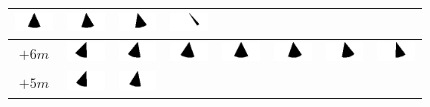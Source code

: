 \begin{tabular}{|c|c|c|c|c|c|c|c|}
	\includegraphics[width=1cm]{img_Bereich/V1_img_res_Winkel_X_0_7000.png}&
	\includegraphics[width=1cm]{img_Bereich/V1_img_res_Winkel_X_1000_7000.png}&
	\includegraphics[width=1cm]{img_Bereich/V1_img_res_Winkel_X_2000_7000.png}&
	\includegraphics[width=1cm]{img_Bereich/V1_img_res_Winkel_X_3000_7000.png}\\ 
	\hline 
	$+6m$ &
	\includegraphics[width=1cm]{img_Bereich/V1_img_res_Winkel_X_-3000_6000.png} &
	\includegraphics[width=1cm]{img_Bereich/V1_img_res_Winkel_X_-2000_6000.png}&
	\includegraphics[width=1cm]{img_Bereich/V1_img_res_Winkel_X_-1000_6000.png}&
	\includegraphics[width=1cm]{img_Bereich/V1_img_res_Winkel_X_0_6000.png}&
	\includegraphics[width=1cm]{img_Bereich/V1_img_res_Winkel_X_1000_6000.png}&
	\includegraphics[width=1cm]{img_Bereich/V1_img_res_Winkel_X_2000_6000.png}&
	\includegraphics[width=1cm]{img_Bereich/V1_img_res_Winkel_X_3000_6000.png}\\ 
	\hline 
	$+5m$ &
	\includegraphics[width=1cm]{img_Bereich/V1_img_res_Winkel_X_-3000_5000.png}&
	\includegraphics[width=1cm]{img_Bereich/V1_img_res_Winkel_X_-2000_5000.png}&

\end{tabular}

